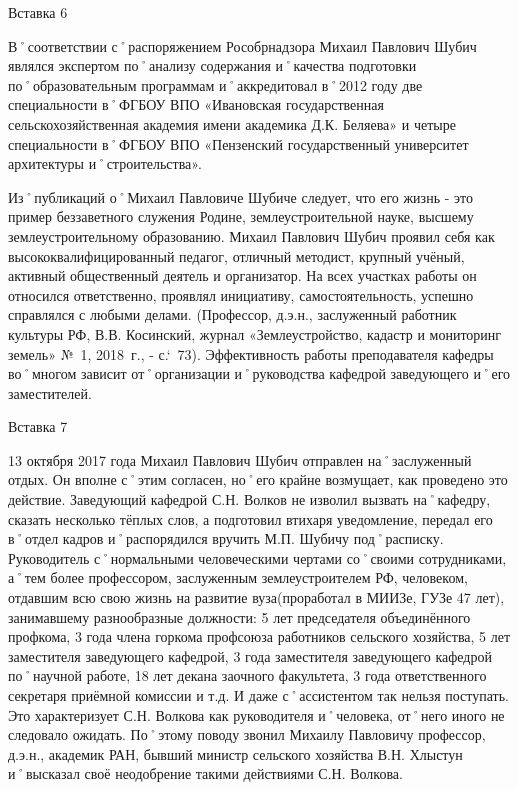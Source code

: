 Вставка 6

В˚соответствии с˚распоряжением Рособрнадзора Михаил Павлович Шубич являлся экспертом по˚анализу содержания и˚качества подготовки по˚образовательным программам и˚аккредитовал в˚2012 году две специальности в˚ФГБОУ ВПО «Ивановская государственная сельскохозяйственная академия имени академика Д.К. Беляева» и четыре специальности в˚ФГБОУ ВПО «Пензенский государственный университет архитектуры и˚строительства». 

Из˚публикаций о˚Михаил Павловиче Шубиче следует, что его жизнь - это пример беззаветного служения Родине, землеустроительной науке, высшему землеустроительному образованию.
Михаил Павлович Шубич проявил себя как высококвалифицированный педагог, отличный методист, крупный учёный, активный общественный деятель и организатор. На всех участках работы он относился ответственно, проявлял инициативу, самостоятельность, успешно справлялся с любыми делами. (Профессор, д.э.н., заслуженный работник культуры РФ, В.В. Косинский, журнал «Землеустройство, кадастр и мониторинг земель» №~1, 2018~г., - с.`~73).
Эффективность работы преподавателя кафедры во˚многом зависит от˚организации и˚руководства кафедрой заведующего и˚его заместителей.

Вставка 7

13 октября 2017 года Михаил Павлович Шубич отправлен на˚заслуженный отдых. Он вполне с˚этим согласен, но˚его крайне возмущает, как проведено это действие. Заведующий кафедрой С.Н. Волков не изволил вызвать на˚кафедру, сказать несколько тёплых слов, а подготовил втихаря уведомление, передал его в˚отдел кадров и˚распорядился вручить М.П. Шубичу под˚расписку. Руководитель с˚нормальными человеческими чертами со˚своими сотрудниками, а˚тем более профессором, заслуженным землеустроителем РФ, человеком, отдавшим всю свою жизнь на развитие вуза(проработал в МИИЗе, ГУЗе 47 лет), занимавшему разнообразные должности: 5 лет председателя объединённого профкома, 3 года члена горкома профсоюза работников сельского хозяйства, 5 лет заместителя заведующего кафедрой, 3 года заместителя заведующего кафедрой по˚научной работе, 18 лет декана заочного факультета, 3 года ответственного секретаря приёмной комиссии и т.д. И даже с˚ассистентом так нельзя поступать. Это характеризует С.Н. Волкова как руководителя и˚человека, от˚него иного не следовало ожидать. По˚этому поводу звонил Михаилу Павловичу профессор, д.э.н., академик РАН, бывший министр сельского хозяйства В.Н. Хлыстун и˚высказал своё неодобрение такими действиями С.Н. Волкова.